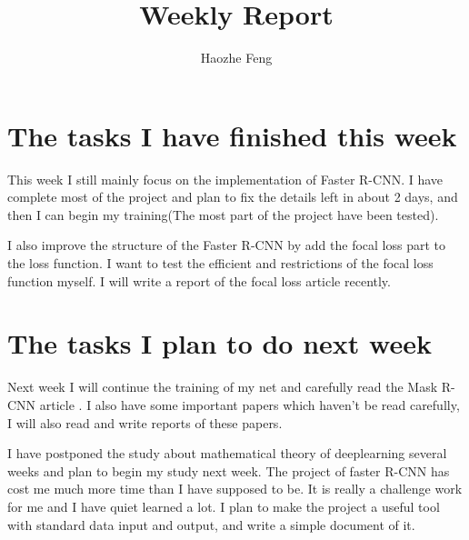 \documentclass{article}
\title{Weekly Report}
\author{Haozhe Feng}
\begin{document}
	\maketitle{}
\section{The tasks I have finished this week}
This week I still mainly focus on the implementation of Faster R-CNN. I have complete most of the project and plan to fix the details left in about 2 days, and then I can begin my training(The most part of the project have been tested). \\
\vspace*{.3cm}

\noindent I also improve the structure of the Faster R-CNN by add the focal loss part to the loss function. I want to test the efficient and restrictions of the focal loss function myself. I will write a report of the focal loss article\cite{DBLP:journals/corr/abs-1708-02002} recently.\\

\section{The tasks I plan to do next week}
Next week I will continue the training of my net and carefully read the Mask R-CNN article \cite{he2017mask}. I also have some important papers which haven't be read carefully, I will also read and write reports of these papers.\\
\vspace*{.3cm}

\noindent I have postponed the study about mathematical theory of deeplearning several weeks and  plan to begin my study next week. The project of faster R-CNN has cost me much more time than I have supposed to be. It is really a challenge work for me and I have quiet learned a lot. I plan to make the project a useful tool with standard data input and output, and write a simple document of it.



\end{document}
